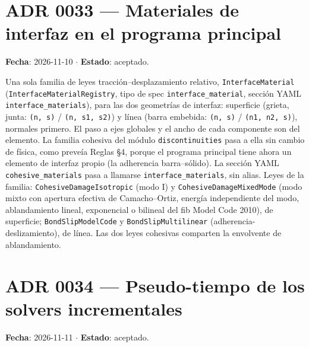 \documentclass[11pt,oneside]{report}
\begin{document}
\section{ADR 0033 --- Materiales de interfaz en el programa principal}
\label{adr:0033}

\textbf{Fecha}: 2026-11-10 \ensuremath{\cdot} \textbf{Estado}: aceptado.

Una sola familia de leyes tracción--desplazamiento relativo, \texttt{InterfaceMaterial} (\texttt{InterfaceMaterialRegistry}, tipo de spec \texttt{interface\_\allowbreak{}material}, sección YAML \texttt{interface\_\allowbreak{}materials}), para las dos geometrías de interfaz: superficie (grieta, junta: \texttt{(n, s)} / \texttt{(n, s1, s2)}) y línea (barra embebida: \texttt{(n, s)} / \texttt{(n1, n2, s)}), normales primero. El paso a ejes globales y el ancho de cada componente son del elemento. La familia cohesiva del módulo \texttt{discontinuities} pasa a ella sin cambio de física, como preveía Reglas §4, porque el programa principal tiene ahora un elemento de interfaz propio (la adherencia barra--sólido). La sección YAML \texttt{cohesive\_\allowbreak{}materials} pasa a llamarse \texttt{interface\_\allowbreak{}materials}, sin alias. Leyes de la familia: \texttt{CohesiveDamageIsotropic} (modo I) y \texttt{CohesiveDamageMixedMode} (modo mixto con apertura efectiva de Camacho--Ortiz, energía independiente del modo, ablandamiento lineal, exponencial o bilineal del fib Model Code 2010), de superficie; \texttt{BondSlipModelCode} y \texttt{BondSlipMultilinear} (adherencia-deslizamiento), de línea. Las dos leyes cohesivas comparten la envolvente de ablandamiento.

\section{ADR 0034 --- Pseudo-tiempo de los solvers incrementales}
\label{adr:0034}

\textbf{Fecha}: 2026-11-11 \ensuremath{\cdot} \textbf{Estado}: aceptado.
\end{document}
